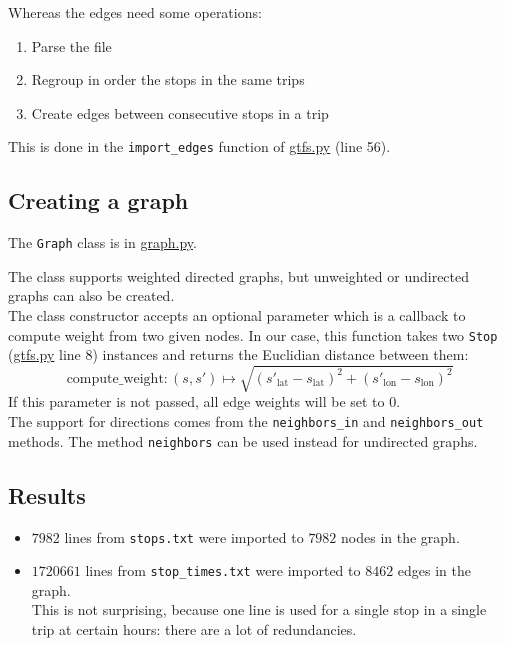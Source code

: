 \documentclass[12pt,english]{article}
\begin{document}
	Whereas the edges need some operations:
	\begin{enumerate}
		\item Parse the file
		\item Regroup in order the stops in the same trips
		\item Create edges between consecutive stops in a trip
	\end{enumerate}
	This is done in the \texttt{import\_edges} function of \hyperref[sec:code:gtfs]{\ttfamily gtfs.py} (line 56).

	\subsection{Creating a graph}\label{sec:step:1.2}

	The \texttt{Graph} class is in \hyperref[sec:code:graph]{\ttfamily graph.py}.

	The class supports weighted directed graphs, but unweighted or undirected graphs can also be created.\\
	The class constructor accepts an optional parameter which is a callback to compute weight from two given nodes.
	In our case, this function takes two \texttt{Stop} (\hyperref[sec:code:gtfs]{\ttfamily gtfs.py} line 8) instances and returns the Euclidian distance between them: \[
		\text{compute\_weight}: (s,s') \mapsto \sqrt{\left(s'_\text{lat} - s_\text{lat}\right)^2 + \left(s'_\text{lon} - s_\text{lon}\right)^2}
	\]
	If this parameter is not passed, all edge weights will be set to \(0\).\\
	The support for directions comes from the \texttt{neighbors\_in} and \texttt{neighbors\_out} methods.
	The method \texttt{neighbors} can be used instead for undirected graphs.

	\subsection{Results}\label{sec:results:1}

	\begin{itemize}
		\item \(7982\) lines from \texttt{stops.txt} were imported to \(7982\) nodes in the graph.
		\item \(1720661\) lines from \texttt{stop\_times.txt} were imported to \(8462\) edges in the graph.\\
		This is not surprising, because one line is used for a single stop in a single trip at certain hours: there are a lot of redundancies.
	\end{itemize}
\end{document}
